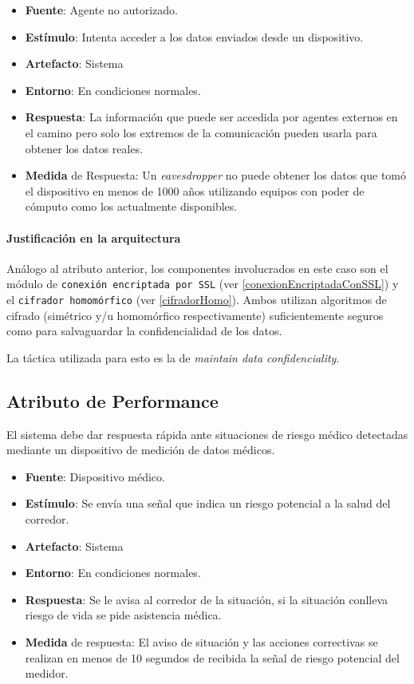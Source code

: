 \begin{itemize}
  \item \textbf{Fuente}: Agente no autorizado.
  \item \textbf{Estímulo}: Intenta acceder a los datos enviados desde un dispositivo.
  \item \textbf{Artefacto}: Sistema
  \item \textbf{Entorno}: En condiciones normales.
  \item \textbf{Respuesta}: La información que puede ser accedida por agentes externos en el camino pero solo los extremos de la comunicación pueden usarla para obtener los datos reales.
  \item \textbf{Medida} de Respuesta: Un \emph{eavesdropper} no puede obtener los datos que tomó el dispositivo en menos de 1000 años utilizando equipos con poder de cómputo como los actualmente disponibles.
\end{itemize}

\paragraph{Justificación en la arquitectura}
Análogo al atributo anterior, los componentes involucrados en este caso son el módulo de \texttt{conexión encriptada por SSL} (ver \ref{conexionEncriptadaConSSL}) y el \texttt{cifrador homomórfico} (ver \ref{cifradorHomo}). Ambos utilizan algoritmos de cifrado (simétrico y/u homomórfico respectivamente) suficientemente seguros como para salvaguardar la confidencialidad de los datos.

La táctica utilizada para esto es la de \emph{maintain data confidenciality}.


\subsection{Atributo de Performance}
El sistema debe dar respuesta rápida ante situaciones de riesgo médico detectadas mediante un dispositivo de medición de datos médicos.

\begin{itemize}
  \item \textbf{Fuente}: Dispositivo médico.
  \item \textbf{Estímulo}: Se envía una señal que indica un riesgo potencial a la salud del corredor.
  \item \textbf{Artefacto}: Sistema
  \item \textbf{Entorno}: En condiciones normales.
  \item \textbf{Respuesta}: Se le avisa al corredor de la situación, si la situación conlleva riesgo de vida se pide asistencia médica.
  \item \textbf{Medida} de respuesta: El aviso de situación y las acciones correctivas se realizan en menos de 10 segundos de recibida la señal de riesgo potencial del medidor.
\end{itemize}

